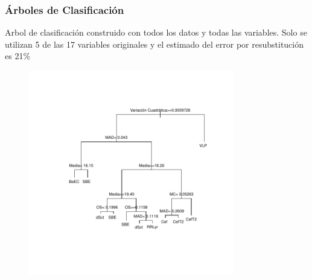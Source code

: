 \documentclass{beamer}
\begin{document}
\begin{frame}
\frametitle{Árboles de Clasificación}
Arbol de clasificación construido con todos los datos y todas las variables. Solo se utilizan 5 de las 17 variables originales y el estimado del error por resubstitución es 21\%
\begin{figure}
  \centering
  \includegraphics[width = 0.8\textwidth]{./img/arbolTotal.pdf}

  \centering
\end{figure}
\end{frame}
\end{document}
